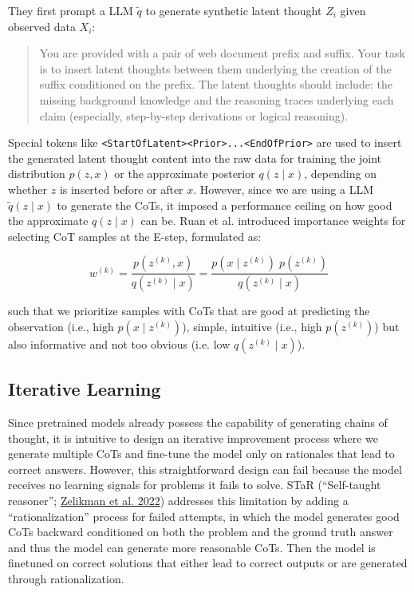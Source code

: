 \documentclass[12pt]{article}
\begin{document}
They first prompt a LLM $\tilde{q}$ to generate synthetic latent thought $Z_i$ given observed data $X_i$:
\begin{quote}
You are provided with a pair of web document prefix and suffix. Your task is to insert latent thoughts between them underlying the creation of the suffix conditioned on the prefix. The latent thoughts should include: the missing background knowledge and the reasoning traces underlying each claim (especially, step-by-step derivations or logical reasoning).
\end{quote}

Special tokens like \texttt{<StartOfLatent><Prior>...<EndOfPrior>} are used to insert the generated latent thought content into the raw data for training the joint distribution $p(z, x)$ or the approximate posterior $q(z \mid x)$, depending on whether $z$ is inserted before or after $x$. However, since we are using a LLM $\tilde{q}(z \mid x)$ to generate the CoTs, it imposed a performance ceiling on how good the approximate $q(z \mid x)$ can be. Ruan et al. introduced importance weights for selecting CoT samples at the E-step, formulated as:

\[
w^{(k)}
= \frac{p(z^{(k)}, x)}{q(z^{(k)} \mid x)}
= \frac{p(x \mid z^{(k)}) \; p(z^{(k)})}{q(z^{(k)} \mid x)}
\]

such that we prioritize samples with CoTs that are good at predicting the observation (i.e., high $p(x \mid z^{(k)})$), simple, intuitive (i.e., high $p(z^{(k)})$) but also informative and not too obvious (i.e. low $q(z^{(k)} \mid x)$).

\subsection{Iterative Learning}
Since pretrained models already possess the capability of generating chains of thought, it is intuitive to design an iterative improvement process where we generate multiple CoTs and fine-tune the model only on rationales that lead to correct answers. However, this straightforward design can fail because the model receives no learning signals for problems it fails to solve. STaR (“Self-taught reasoner”; \href{https://arxiv.org/abs/2203.14465}{Zelikman et al. 2022}) addresses this limitation by adding a “rationalization” process for failed attempts, in which the model generates good CoTs backward conditioned on both the problem and the ground truth answer and thus the model can generate more reasonable CoTs. Then the model is finetuned on correct solutions that either lead to correct outputs or are generated through rationalization.
\end{document}

